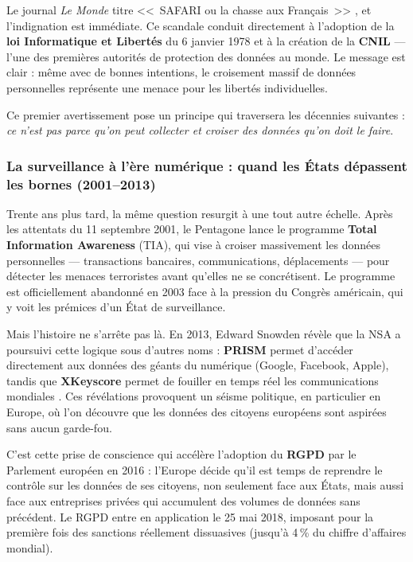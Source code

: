 \documentclass[12pt,a4paper]{article}
\begin{document}
Le journal \textit{Le Monde} titre <<~SAFARI ou la chasse aux Français~>> \cite{safari_lemonde}, et l'indignation est immédiate. Ce scandale conduit directement à l'adoption de la \textbf{loi Informatique et Libertés} du 6 janvier 1978 \cite{loi_informatique_libertes} et à la création de la \textbf{CNIL} --- l'une des premières autorités de protection des données au monde. Le message est clair : même avec de bonnes intentions, le croisement massif de données personnelles représente une menace pour les libertés individuelles.

Ce premier avertissement pose un principe qui traversera les décennies suivantes : \textit{ce n'est pas parce qu'on peut collecter et croiser des données qu'on doit le faire}.

\subsubsection{La surveillance à l'ère numérique : quand les États dépassent les bornes (2001--2013)}

Trente ans plus tard, la même question resurgit à une tout autre échelle. Après les attentats du 11 septembre 2001, le Pentagone lance le programme \textbf{Total Information Awareness} (TIA), qui vise à croiser massivement les données personnelles --- transactions bancaires, communications, déplacements --- pour détecter les menaces terroristes avant qu'elles ne se concrétisent. Le programme est officiellement abandonné en 2003 face à la pression du Congrès américain, qui y voit les prémices d'un État de surveillance.

Mais l'histoire ne s'arrête pas là. En 2013, Edward Snowden révèle que la NSA a poursuivi cette logique sous d'autres noms : \textbf{PRISM} permet d'accéder directement aux données des géants du numérique (Google, Facebook, Apple), tandis que \textbf{XKeyscore} permet de fouiller en temps réel les communications mondiales \cite{snowden_greenwald}. Ces révélations provoquent un séisme politique, en particulier en Europe, où l'on découvre que les données des citoyens européens sont aspirées sans aucun garde-fou.

C'est cette prise de conscience qui accélère l'adoption du \textbf{RGPD} par le Parlement européen en 2016 \cite{rgpd_officiel} : l'Europe décide qu'il est temps de reprendre le contrôle sur les données de ses citoyens, non seulement face aux États, mais aussi face aux entreprises privées qui accumulent des volumes de données sans précédent. Le RGPD entre en application le 25 mai 2018, imposant pour la première fois des sanctions réellement dissuasives (jusqu'à 4\,\% du chiffre d'affaires mondial).
\end{document}

